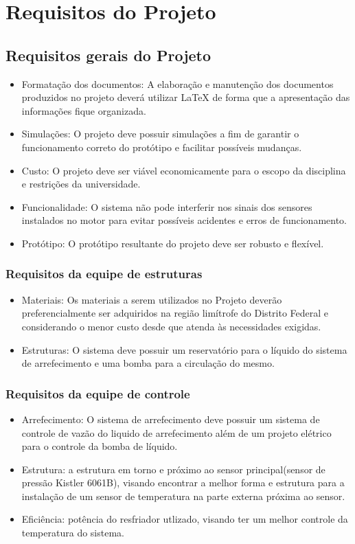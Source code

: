 \chapter{Requisitos do Projeto}

\section{Requisitos gerais do Projeto}

\begin{itemize}
\item Formatação dos documentos: A elaboração e manutenção dos documentos produzidos no projeto deverá utilizar LaTeX de forma que a apresentação das informações fique organizada.
\item Simulações: O projeto deve possuir simulações a fim de garantir o funcionamento correto do protótipo e facilitar possíveis mudanças.
\item Custo: O projeto deve ser viável economicamente para o escopo da disciplina e restrições da universidade.
\item Funcionalidade: O sistema não pode interferir nos sinais dos sensores instalados no motor para evitar possíveis acidentes e erros de funcionamento.
\item Protótipo: O protótipo resultante do projeto deve ser robusto e flexível.
\end{itemize}

\subsection{Requisitos da equipe de estruturas}
\begin{itemize}
\item Materiais: Os materiais a serem utilizados no Projeto deverão preferencialmente ser adquiridos na região limítrofe do Distrito Federal e considerando o menor custo desde que atenda às necessidades exigidas.
\item Estruturas: O sistema deve possuir um reservatório para o líquido do sistema de arrefecimento e uma bomba para a circulação do mesmo.
\end{itemize}

\subsection{Requisitos da equipe de controle}
\begin{itemize}
\item Arrefecimento: O sistema de arrefecimento deve possuir  um sistema de controle de vazão do liquido de arrefecimento além de um projeto elétrico para o controle da bomba de líquido.
\item Estrutura: a estrutura em torno e próximo ao sensor principal(sensor de pressão Kistler 6061B), visando encontrar a melhor forma e estrutura para a instalação de um sensor de temperatura na parte externa próxima ao sensor.
\item Eficiência: potência do resfriador utlizado, visando ter um melhor controle da temperatura do sistema. 
\end{itemize}

